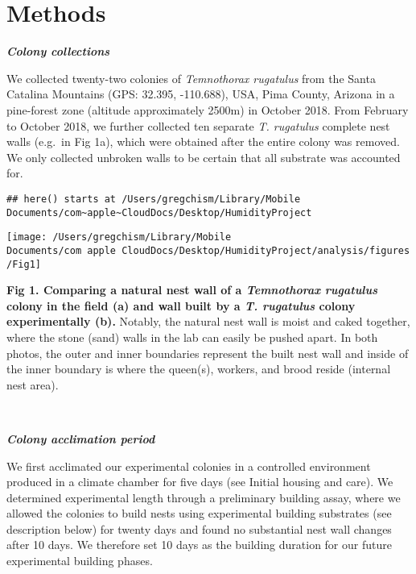 \documentclass[3p]{elsarticle} %
\begin{document}
\hypertarget{methods}{%
\section{Methods}\label{methods}}

\textbf{\emph{Colony collections}}

We collected twenty-two colonies of \emph{Temnothorax rugatulus} from
the Santa Catalina Mountains (GPS: 32.395, -110.688), USA, Pima County,
Arizona in a pine-forest zone (altitude approximately 2500m) in October
2018. From February to October 2018, we further collected ten separate
\emph{T. rugatulus} complete nest walls (e.g.~in Fig 1a), which were
obtained after the entire colony was removed. We only collected unbroken
walls to be certain that all substrate was accounted for.

\begin{verbatim}
## here() starts at /Users/gregchism/Library/Mobile Documents/com~apple~CloudDocs/Desktop/HumidityProject
\end{verbatim}

\begin{flushleft}\texttt{[image: /Users/gregchism/Library/Mobile Documents/com~apple~CloudDocs/Desktop/HumidityProject/analysis/figures/Fig1]} \end{flushleft}

\textbf{Fig 1. Comparing a natural nest wall of a \emph{Temnothorax
rugatulus} colony in the field (a) and wall built by a \emph{T.
rugatulus} colony experimentally (b).} Notably, the natural nest wall is
moist and caked together, where the stone (sand) walls in the lab can
easily be pushed apart. In both photos, the outer and inner boundaries
represent the built nest wall and inside of the inner boundary is where
the queen(s), workers, and brood reside (internal nest area).

~

\textbf{\emph{Colony acclimation period}}

We first acclimated our experimental colonies in a controlled
environment produced in a climate chamber for five days (see Initial
housing and care). We determined experimental length through a
preliminary building assay, where we allowed the colonies to build nests
using experimental building substrates (see description below) for
twenty days and found no substantial nest wall changes after 10 days. We
therefore set 10 days as the building duration for our future
experimental building phases.
\end{document}
